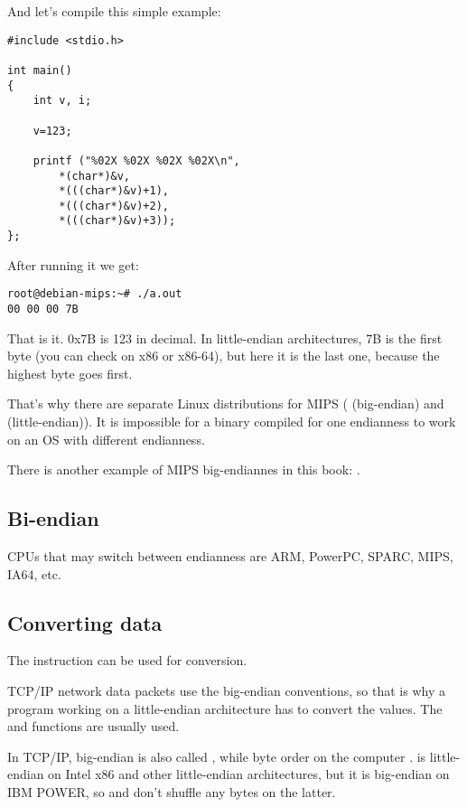 And let's compile this simple example:

\begin{lstlisting}[style=customc]
#include <stdio.h>

int main()
{
	int v, i;

	v=123;

	printf ("%02X %02X %02X %02X\n", 
		*(char*)&v,
		*(((char*)&v)+1),
		*(((char*)&v)+2),
		*(((char*)&v)+3));
};
\end{lstlisting}

After running it we get:

\begin{lstlisting}
root@debian-mips:~# ./a.out 
00 00 00 7B
\end{lstlisting}

That is it.
0x7B is 123 in decimal.
In little-endian architectures, 7B is the first byte (you can check on x86 or x86-64), 
but here it is the last one, because the highest byte goes first.

That's why there are separate Linux distributions for MIPS
( (big-endian) and  (little-endian)).
It is impossible for a binary compiled for one endianness to work on an \ac{OS} with different endianness. 

There is another example of MIPS big-endiannes in this book: .

\subsection{Bi-endian}

CPUs that may switch between endianness are ARM, PowerPC, SPARC, MIPS, \ac{IA64}, etc.

\subsection{Converting data}

The  instruction can be used for conversion.

TCP/IP network data packets use the big-endian conventions, so that is why a program working on a little-endian architecture
has to convert the values.
The  and  functions are usually used.

In TCP/IP, big-endian is also called , while byte order on the computer .
 is little-endian on Intel x86 and other little-endian architectures,
but it is big-endian on IBM POWER, so  and  don't shuffle any bytes on the latter.

